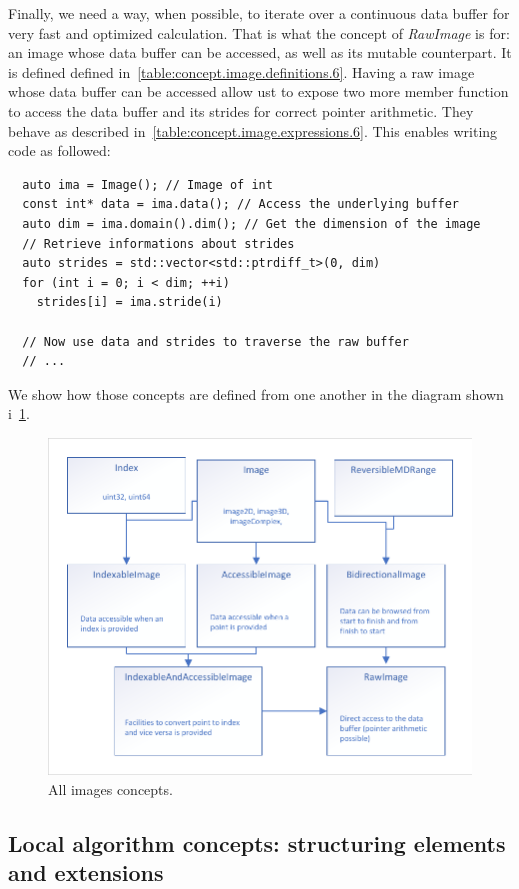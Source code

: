 Finally, we need a way, when possible, to iterate over a continuous data buffer for very fast and optimized calculation.
That is what the concept of \emph{RawImage} is for: an image whose data buffer can be accessed, as well as its mutable
counterpart. It is defined defined in~\cref{table:concept.image.definitions.6}. Having a raw image whose data buffer can
be accessed allow ust to expose two more member function to access the data buffer and its strides for correct pointer
arithmetic. They behave as described in~\cref{table:concept.image.expressions.6}. This enables writing code as followed:
\begin{verbatim}
  auto ima = Image(); // Image of int
  const int* data = ima.data(); // Access the underlying buffer
  auto dim = ima.domain().dim(); // Get the dimension of the image
  // Retrieve informations about strides
  auto strides = std::vector<std::ptrdiff_t>(0, dim)
  for (int i = 0; i < dim; ++i)
    strides[i] = ima.stride(i)

  // Now use data and strides to traverse the raw buffer
  // ...
\end{verbatim}

We show how those concepts are defined from one another in the diagram shown i~\cref{fig:concept.images}.

\begin{figure}[htbp]
  \centering
  \includegraphics[width=.8\linewidth]{figs/concepts/images_all.pdf}
  \caption{All images concepts.}
  \label{fig:concept.images}
\end{figure}


\subsection{Local algorithm concepts: structuring elements and extensions}
\label{subsec:local.se.ext}

